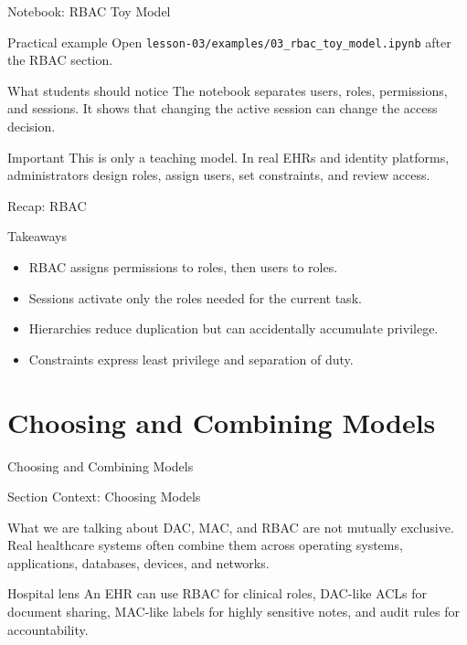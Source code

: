 \documentclass[presentation]{beamer}
\newcommand{\sectiontitleframe}[1]{
\begin{frame}[plain,c]
\begin{center}
{\usebeamerfont{title}\usebeamercolor[fg]{title}#1}
\end{center}
\end{frame}
}
\begin{document}
\begin{frame}[c]{Notebook: RBAC Toy Model}
\begin{block}{Practical example}
Open \texttt{lesson-03/examples/03\_rbac\_toy\_model.ipynb} after the RBAC section.
\end{block}

\begin{exampleblock}{What students should notice}
The notebook separates users, roles, permissions, and sessions. It shows that changing the active
session can change the access decision.
\end{exampleblock}

\begin{block}{Important}
This is only a teaching model. In real EHRs and identity platforms, administrators design roles,
assign users, set constraints, and review access.
\end{block}
\end{frame}

\begin{frame}[c]{Recap: RBAC}
\begin{block}{Takeaways}
\begin{itemize}
    \item RBAC assigns permissions to roles, then users to roles.
    \item Sessions activate only the roles needed for the current task.
    \item Hierarchies reduce duplication but can accidentally accumulate privilege.
    \item Constraints express least privilege and separation of duty.
\end{itemize}
\end{block}
\end{frame}

\section{Choosing and Combining Models}
\sectiontitleframe{Choosing and Combining Models}

\begin{frame}[c]{Section Context: Choosing Models}
\begin{block}{What we are talking about}
DAC, MAC, and RBAC are not mutually exclusive. Real healthcare systems often combine them across
operating systems, applications, databases, devices, and networks.
\end{block}

\begin{exampleblock}{Hospital lens}
An EHR can use RBAC for clinical roles, DAC-like ACLs for document sharing, MAC-like labels for
highly sensitive notes, and audit rules for accountability.
\end{exampleblock}
\end{frame}
\end{document}
